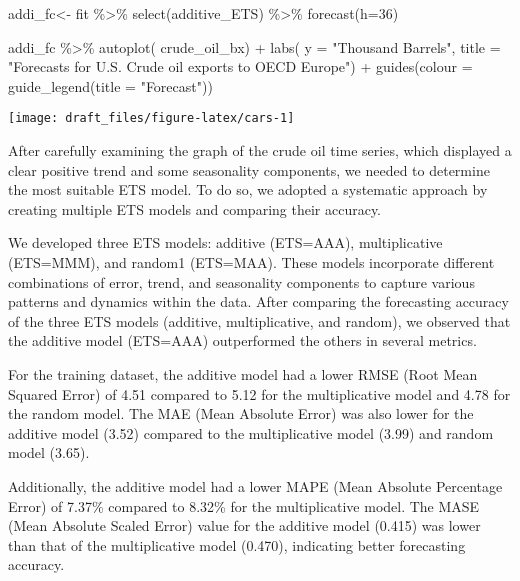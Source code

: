 \documentclass[
]{article}
\newenvironment{Shaded}{\begin{snugshade}}{\end{snugshade}}
\newcommand{\AttributeTok}[1]{\textcolor[rgb]{0.77,0.63,0.00}{#1}}
\newcommand{\DecValTok}[1]{\textcolor[rgb]{0.00,0.00,0.81}{#1}}
\newcommand{\FunctionTok}[1]{\textcolor[rgb]{0.00,0.00,0.00}{#1}}
\newcommand{\NormalTok}[1]{#1}
\newcommand{\OtherTok}[1]{\textcolor[rgb]{0.56,0.35,0.01}{#1}}
\newcommand{\SpecialCharTok}[1]{\textcolor[rgb]{0.00,0.00,0.00}{#1}}
\newcommand{\StringTok}[1]{\textcolor[rgb]{0.31,0.60,0.02}{#1}}
\begin{document}
\begin{Shaded}
\begin{Highlighting}[]
\NormalTok{addi\_fc}\OtherTok{\textless{}{-}}\NormalTok{ fit }\SpecialCharTok{\%\textgreater{}\%} \FunctionTok{select}\NormalTok{(additive\_ETS) }\SpecialCharTok{\%\textgreater{}\%} \FunctionTok{forecast}\NormalTok{(}\AttributeTok{h=}\DecValTok{36}\NormalTok{)}

\NormalTok{addi\_fc }\SpecialCharTok{\%\textgreater{}\%} 
  \FunctionTok{autoplot}\NormalTok{(}
\NormalTok{    crude\_oil\_bx) }\SpecialCharTok{+}
  \FunctionTok{labs}\NormalTok{(}
    \AttributeTok{y =} \StringTok{"Thousand Barrels"}\NormalTok{,}
    \AttributeTok{title =} \StringTok{"Forecasts for U.S. Crude oil exports to OECD Europe"}\NormalTok{) }\SpecialCharTok{+}
  \FunctionTok{guides}\NormalTok{(}\AttributeTok{colour =} \FunctionTok{guide\_legend}\NormalTok{(}\AttributeTok{title =} \StringTok{"Forecast"}\NormalTok{))}
\end{Highlighting}
\end{Shaded}

\begin{center}\texttt{[image: draft\_files/figure-latex/cars-1]} \end{center}

After carefully examining the graph of the crude oil time series, which
displayed a clear positive trend and some seasonality components, we
needed to determine the most suitable ETS model. To do so, we adopted a
systematic approach by creating multiple ETS models and comparing their
accuracy.

We developed three ETS models: additive (ETS=AAA), multiplicative
(ETS=MMM), and random1 (ETS=MAA). These models incorporate different
combinations of error, trend, and seasonality components to capture
various patterns and dynamics within the data. After comparing the
forecasting accuracy of the three ETS models (additive, multiplicative,
and random), we observed that the additive model (ETS=AAA) outperformed
the others in several metrics.

For the training dataset, the additive model had a lower RMSE (Root Mean
Squared Error) of 4.51 compared to 5.12 for the multiplicative model and
4.78 for the random model. The MAE (Mean Absolute Error) was also lower
for the additive model (3.52) compared to the multiplicative model
(3.99) and random model (3.65).

Additionally, the additive model had a lower MAPE (Mean Absolute
Percentage Error) of 7.37\% compared to 8.32\% for the multiplicative
model. The MASE (Mean Absolute Scaled Error) value for the additive
model (0.415) was lower than that of the multiplicative model (0.470),
indicating better forecasting accuracy.
\end{document}
